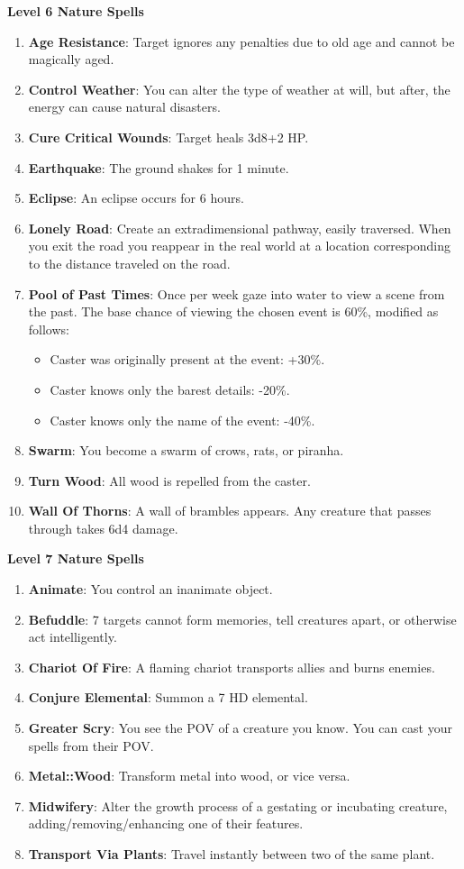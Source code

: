 \documentclass[twoside]{article}
\begin{document}
\textbf{Level 6 Nature Spells}
\begin{enumerate}[nosep]
\item \textbf{Age Resistance}: Target ignores any penalties due to old age and cannot be magically aged.
\item \textbf{Control Weather}: You can alter the type of weather at will, but after, the energy can cause natural disasters.
\item \textbf{Cure Critical Wounds}: Target heals 3d8+2 HP.
\item \textbf{Earthquake}: The ground shakes for 1 minute.
\item \textbf{Eclipse}: An eclipse occurs for 6 hours.
\item \textbf{Lonely Road}: Create an extradimensional pathway, easily traversed. When you exit the road you reappear in the real world at a location corresponding to the distance traveled on the road.
\item \textbf{Pool of Past Times}: Once per week gaze into water to view a scene from the past. The base chance of viewing the chosen event is 60\%, modified as follows: 
\begin{itemize}[nosep]
\item Caster was originally present at the event: +30\%. 
\item Caster knows only the barest details: -20\%. 
\item Caster knows only the name of the event: -40\%.
\end{itemize}
\item \textbf{Swarm}: You become a swarm of crows, rats, or piranha.
\item \textbf{Turn Wood}: All wood is repelled from the caster.
\item \textbf{Wall Of Thorns}: A wall of brambles appears. Any creature that passes through takes 6d4 damage.
\end{enumerate}

\textbf{Level 7 Nature Spells}
\begin{enumerate}[nosep]
\item \textbf{Animate}: You control an inanimate object.
\item \textbf{Befuddle}: 7 targets cannot form memories, tell creatures apart, or otherwise act intelligently.
\item \textbf{Chariot Of Fire}: A flaming chariot transports allies and burns enemies.
\item \textbf{Conjure Elemental}: Summon a 7 HD elemental.
\item \textbf{Greater Scry}: You see the POV of a creature you know. You can cast your spells from their POV.
\item \textbf{Metal::Wood}: Transform metal into wood, or vice versa.
\item \textbf{Midwifery}: Alter the growth process of a gestating or incubating creature, adding/removing/enhancing one of their features.
\item \textbf{Transport Via Plants}: Travel instantly between two of the same plant.
\end{enumerate}
\end{document}
